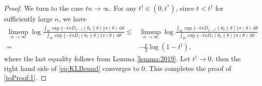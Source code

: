 \documentclass[11pt]{article}
\theoremstyle{plain}
\theoremstyle{definition}
\theoremstyle{remark}
\begin{document}
\begin{appendices}
\begin{proof}
We turn to the case $tn \to \infty$. 
For any $t^\dagger \in (0,t^*)$,
since $t < t^\dagger$ for sufficiently large $n$, we have
\begin{align*}
    \limsup_{n \to \infty}
    \log
        \frac{
            \int_{\Theta} \exp \{-tn D_{1-t}(\theta_0 \| \theta)\} \pi (\theta) \, \mathrm d \theta
        }{
            \int_{\Theta} \exp \{-tn D_{1}(\theta_0 \| \theta)\} \pi (\theta) \, \mathrm d \theta
        }
        \leq&
    \limsup_{n \to \infty}
\log
        \frac{
            \int_{\Theta} \exp \{-tn D_{1-t^\dagger}(\theta_0 \| \theta)\} \pi (\theta) \, \mathrm d \theta
        }{
            \int_{\Theta} \exp \{-tn D_{1}(\theta_0 \| \theta)\} \pi (\theta) \, \mathrm d \theta
        }
        \\
 = &
 -\frac{p}{2}\log(1-t^\dagger)
 ,
\end{align*}
where the last equality follows from Lemma \ref{lemma:2019}.
Let $t^\dagger \to 0$, then the right hand side of \eqref{eq:KLBound} converges to $0$.
This completes the proof of \eqref{toProof:1}.



\end{proof}
\end{appendices}
\end{document}
